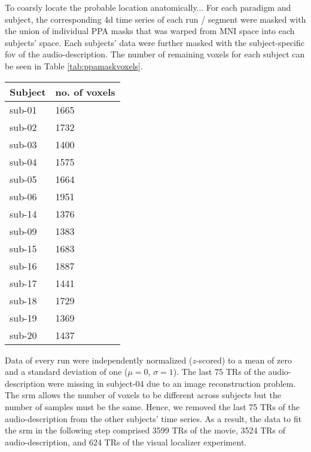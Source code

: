 

To coarsly locate the probable location anatomically...
For each paradigm and subject, the corresponding 4d time series of each run /
segment were masked with the union of individual PPA masks
\citep[s.][]{haeusler2022processing} that was warped from MNI space into each
subjects' space.
Each subjects' data were further masked with the subject-specific \ac{fov} of
the audio-description.
%
The number of remaining voxels for each subject can be seen in Table
\ref{tab:ppamaskvoxels}.


\begin{table*}[btp]
    \caption{Number of remaining voxels after each subject's brain was masked
    with the union of individual \acp{ppa} that was warped from MNI space into
    each individual's subjects-space and a subject's-specific FoV from AO study.}

\label{tab:ppamaskvoxels}
\begin{tabular}{ll}
\toprule
\textbf{Subject} & \textbf{no. of voxels} \\
\midrule
sub-01 & 1665 \tabularnewline
sub-02 & 1732 \tabularnewline
sub-03 & 1400 \tabularnewline
sub-04 & 1575 \tabularnewline
sub-05 & 1664 \tabularnewline
sub-06 & 1951 \tabularnewline
sub-14 & 1376 \tabularnewline
sub-09 & 1383 \tabularnewline
sub-15 & 1683 \tabularnewline
sub-16 & 1887 \tabularnewline
sub-17 & 1441 \tabularnewline
sub-18 & 1729 \tabularnewline
sub-19 & 1369 \tabularnewline
sub-20 & 1437 \tabularnewline
\bottomrule
\end{tabular}
\end{table*}

Data of every run were independently normalized ($z$-scored) to a mean of zero
and a standard deviation of one ($\mu=0$, $\sigma=1$).
%
The last 75 TRs of the audio-description were missing in subject-04 due to an
image reconstruction problem.
%
The \ac{srm} allows the number of voxels to be different across subjects but the
number of samples must be the same.
%
Hence, we removed the last 75 TRs of the audio-description from the other
subjects' time series.
As a result, the data to fit the \ac{srm} in the following step comprised 3599
TRs of the movie, 3524 TRs of audio-description, and 624 TRs of the visual
localizer experiment.

